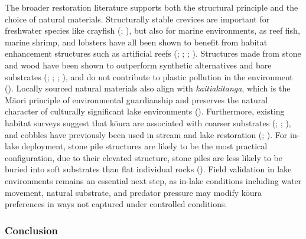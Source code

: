 \documentclass[
  letterpaper,
  DIV=11,
  numbers=noendperiod]{scrartcl}
\begin{document}
The broader restoration literature supports both the structural
principle and the choice of natural materials. Structurally stable
crevices are important for freshwater species like crayfish
(;
), but also for
marine environments, as reef fish, marine shrimp, and lobsters have all
been shown to benefit from habitat enhancement structures such as
artificial reefs (;
;
;
). Structures
made from stone and wood have been shown to outperform synthetic
alternatives and bare substrates (; ; ;
), and do not
contribute to plastic pollution in the environment
(). Locally sourced
natural materials also align with \emph{kaitiakitanga}, which is the
Māori principle of environmental guardianship and preserves the natural
character of culturally significant lake environments
().
Furthermore, existing habitat surveys suggest that kōura are associated
with coarser substrates (; ;
), and cobbles have
previously been used in stream and lake restoration
(;
). For in-lake
deployment, stone pile structures are likely to be the most practical
configuration, due to their elevated structure, stone piles are less
likely to be buried into soft substrates than flat individual rocks
(). Field
validation in lake environments remains an essential next step, as
in-lake conditions including water movement, natural substrate, and
predator pressure may modify kōura preferences in ways not captured
under controlled conditions.

\subsubsection{Conclusion}\label{conclusion}
\end{document}
